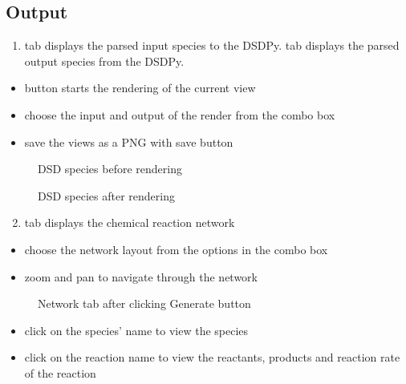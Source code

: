 \documentclass[a4paper,12pt,oneside,english]{sphinxmanual}
\begin{document}
\subsection{Output}
\label{\detokenize{tutorial:output}}\begin{enumerate}
\item {} 
 tab displays the parsed input species to the DSDPy.  tab displays the parsed output species from the DSDPy.

\end{enumerate}
\begin{itemize}
\item {} 
 button starts the rendering of the current view

\item {} 
choose the input and output of the render from the combo box

\item {} 
save the views as a PNG with save button

\end{itemize}

\begin{figure}[htbp]
\centering
\capstart

\noindent{}
\caption{DSD species before rendering}\label{\detokenize{tutorial:id5}}\end{figure}

\begin{figure}[htbp]
\centering
\capstart

\noindent{}
\caption{DSD species after rendering}\label{\detokenize{tutorial:id6}}\end{figure}
\begin{enumerate}
\setcounter{enumi}{1}
\item {} 
 tab displays the chemical reaction network

\end{enumerate}
\begin{itemize}
\item {} 
choose the network layout from the options in the combo box

\item {} 
zoom and pan to navigate through the network

\end{itemize}

\begin{figure}[htbp]
\centering
\capstart

\noindent{}
\caption{Network tab after clicking Generate button}\label{\detokenize{tutorial:id7}}\end{figure}
\begin{itemize}
\item {} 
click on the species’ name to view the species

\item {} 
click on the reaction name to view the reactants, products and reaction rate of the reaction

\end{itemize}
\end{document}
